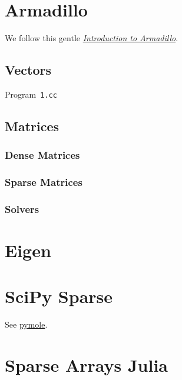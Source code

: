 \section{Armadillo}

We follow this gentle
\href{https://anderkve.github.io/FYS3150/book/introduction_to_cpp/intro_to_armadillo.html}{\emph{Introduction to Armadillo}}.

\subsection{Vectors}

\begin{listing}[ht!]
	\tiny
	\centering
	\caption{Program~\texttt{1.cc}}
	\label{code:1.m}
\end{listing}

\subsection{Matrices}

\subsubsection{Dense Matrices}

\subsubsection{Sparse Matrices}

\subsubsection{Solvers}

\section{Eigen}

\section{SciPy Sparse}

See \href{https://github.com/nutrik/pymole}{pymole}.

\section{Sparse Arrays Julia}

